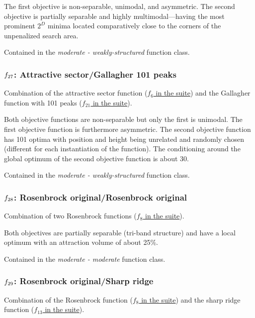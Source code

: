 \documentclass[letterpaper,12pt,english]{article}
\begin{document}
The first objective is non-separable, unimodal, and asymmetric.
The second objective is partially separable and highly multimodal---having
the most prominent \(2^D\) minima located comparatively close to the
corners of the unpenalized search area.

Contained in the \emph{moderate - weakly-structured} function class.


\subsubsection{\protect\(f_{27}\protect\): Attractive sector/Gallagher 101 peaks}
\label{index:f27}\label{index:attractive-sector-gallagher-101-peaks}
Combination of the attractive sector function (\href{http://coco.lri.fr/downloads/download15.03/bbobdocfunctions.pdf\#page=30}{\(f_6\) in the  suite}) and the Gallagher function with 101 peaks (\href{http://coco.lri.fr/downloads/download15.03/bbobdocfunctions.pdf\#page=105}{\(f_{21}\) in the  suite}).

Both objective functions are non-separable but only the first
is unimodal. The first objective function is furthermore asymmetric.
The second objective function has 101 optima with position and height
being unrelated and randomly chosen (different for each instantiation
of the function). The conditioning around the global optimum of the second
objective function is about 30.

Contained in the \emph{moderate - weakly-structured} function class.


\subsubsection{\protect\(f_{28}\protect\): Rosenbrock original/Rosenbrock original}
\label{index:rosenbrock-original-rosenbrock-original}\label{index:f28}
Combination of two Rosenbrock functions (\href{http://coco.lri.fr/downloads/download15.03/bbobdocfunctions.pdf\#page=40}{\(f_8\) in the  suite}).

Both objectives are partially separable (tri-band structure) and have
a local optimum with an attraction volume of about 25\%.

Contained in the \emph{moderate - moderate} function class.


\subsubsection{\protect\(f_{29}\protect\): Rosenbrock original/Sharp ridge}
\label{index:rosenbrock-original-sharp-ridge}\label{index:f29}
Combination of the Rosenbrock function (\href{http://coco.lri.fr/downloads/download15.03/bbobdocfunctions.pdf\#page=40}{\(f_8\) in the  suite}) and the
sharp ridge function (\href{http://coco.lri.fr/downloads/download15.03/bbobdocfunctions.pdf\#page=65}{\(f_{13}\) in the  suite}).
\end{document}
